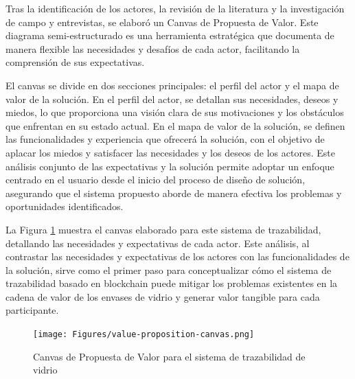 Tras la identificación de los actores, la revisión de la literatura y la investigación de campo y entrevistas, se elaboró un Canvas de Propuesta de Valor. Este diagrama semi-estructurado es una herramienta estratégica que documenta de manera flexible las necesidades y desafíos de cada actor, facilitando la comprensión de sus expectativas.

El canvas se divide en dos secciones principales: el perfil del actor y el mapa de valor de la solución. En el perfil del actor, se detallan sus necesidades, deseos y miedos, lo que proporciona una visión clara de sus motivaciones y los obstáculos que enfrentan en su estado actual. En el mapa de valor de la solución, se definen las funcionalidades y experiencia que ofrecerá la solución, con el objetivo de aplacar los miedos y satisfacer las necesidades y los deseos de los actores. Este análisis conjunto de las expectativas y la solución permite adoptar un enfoque centrado en el usuario desde el inicio del proceso de diseño de solución, asegurando que el sistema propuesto aborde de manera efectiva los problemas y oportunidades identificados.

La Figura \ref{fig:value-proposition-canvas} muestra el canvas elaborado para este sistema de trazabilidad, detallando las necesidades y expectativas de cada actor. Este análisis, al contrastar las necesidades y expectativas de los actores con las funcionalidades de la solución, sirve como el primer paso para conceptualizar cómo el sistema de trazabilidad basado en blockchain puede mitigar los problemas existentes en la cadena de valor de los envases de vidrio y generar valor tangible para cada participante.

\begin{figure}[!htpb]
    \centering
    \texttt{[image: Figures/value-proposition-canvas.png]}
    \caption{Canvas de Propuesta de Valor para el sistema de trazabilidad de vidrio}
    \label{fig:value-proposition-canvas}
\end{figure}

